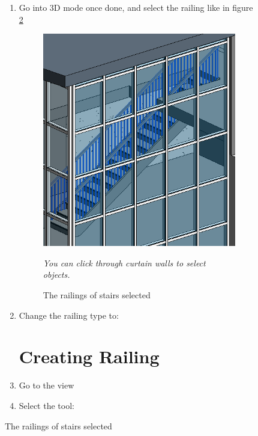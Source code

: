 \documentclass{tufte-book} %
\begin{document}
\begin{figure}
\begin{enumerate}
	\item Go into 3D mode once done, and select the railing like in figure \ref{fig:revstairrail}
	
	\begin{figure}
		\includegraphics[width=\linewidth]{revitstairraillings.png}
		\caption{The railings of stairs selected}
		\emph{You can click through curtain walls to select objects.}
		\label{fig:revstairrail}
	\end{figure}
	
	\item Change the railing type to: 

	
\section{Creating Railing}
	\item Go to the  view
	\item Select the tool: 


\end{enumerate}
\end{figure}
\end{document}
